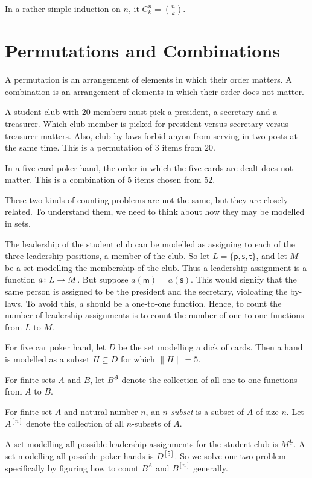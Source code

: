 In a rather simple induction on $n$, it $C^n_k = \binom nk$.  

\section{Permutations and Combinations}

A permutation is an arrangement of elements in which their order matters. 
A combination is an arrangement of elements in which their order does not matter.

A student club with $20$ members must pick a president, a secretary and a treasurer.
Which club member is picked for president versus secretary versus treasurer matters. Also, club by-laws forbid anyon from serving in two posts at the same time.
This is a permutation of $3$ items from $20$. 

In a five card poker hand, the order in which the five cards are dealt does not matter. This is a combination of $5$ items chosen from $52$.

These two kinds of counting problems are not the same, but they are closely related.
To understand them, we need to think about how they may be modelled in sets.

The leadership of the student club can be modelled as assigning to each of the three leadership positions, a member of the club. 
So let $L=\{\textsf{p},\textsf{s},\textsf{t}\}$, and let $M$ be a set modelling the membership of the club. 
Thus a leadership assignment is a function ${a}\colon{L}\to{M}$.
But suppose $a(\textsf{m}) = a(\textsf{s})$.
This would signify that the same person is assigned to be the president and the secretary, violoating the by-laws.
To avoid this, $a$ should be a one-to-one function.
Hence, to count the number of leadership assignments is to count the number of one-to-one functions from $L$ to $M$.

For five car poker hand, let $D$ be the set modelling a dick of cards. Then a hand is modelled as a subset $H\subseteq D$ for which $\lVert H\rVert = 5$.

\begin{defn}
	For finite sets $A$ and $B$, let $B^{\underline A}$ denote the collection of all one-to-one functions from $A$ to $B$.
	
	For finite set $A$ and natural number $n$, an \emph{$n$-subset} is a subset of $A$ of size $n$. Let $A^{[n]}$ denote the collection of all $n$-subsets of $A$.
\end{defn}

A set modelling all possible leadership assignments for the student club is $M^{\underline L}$. A set modelling all possible poker hands is $D^{[5]}$. So we solve our two problem specifically by figuring how to count $B^{\underline A}$ and $B^{[n]}$ generally.

